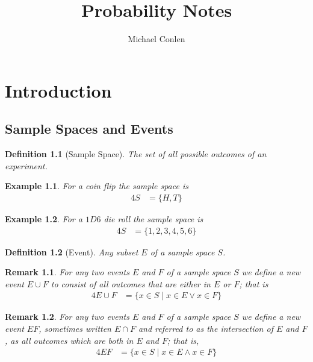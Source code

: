\documentclass[11pt, oneside]{book}   	%
\title{Probability Notes}
\author{Michael Conlen}
\newtheorem{definition}{Definition}
\newtheorem{example}{Example}
\newtheorem{remark}{Remark}
\begin{document}
\maketitle
\tableofcontents

\chapter{Introduction}
\section{Sample Spaces and Events}
\begin{definition}[Sample Space]
	The set of all possible outcomes of an experiment. 
\end{definition}

\begin{example}
	For a coin flip the \emph{sample space} is 
	\begin{alignat}{4}
		S&=\{H, T\}
	\end{alignat}
\end{example}
\begin{example}
	For a $1D6$ die roll the \emph{sample space} is
	\begin{alignat}{4}
		S&=\{1, 2, 3, 4, 5, 6\}
	\end{alignat}
\end{example}

\begin{definition}[Event]
	Any subset $E$ of a sample space $S$.
\end{definition}

\begin{remark}
	For any two events $E$ and $F$ of a sample space $S$ we define a new event $E\cup F$ to consist of all outcomes that are either in $E$ or $F$; that is
	\begin{alignat}{4}
		E\cup F&=\{x\in S\mid x\in E \vee x\in F\}
	\end{alignat}
\end{remark}

\begin{remark}
	For any two events $E$ and $F$ of a sample space $S$ we define a new event $EF$, sometimes written $E\cap F$ and referred to as the intersection of $E$ and $F$, as all outcomes which are both in $E$ and $F$; that is, 
	\begin{alignat}{4}
		EF&=\{x\in S\mid x\in E \wedge x\in F\}
	\end{alignat}
\end{remark}
\end{document}
